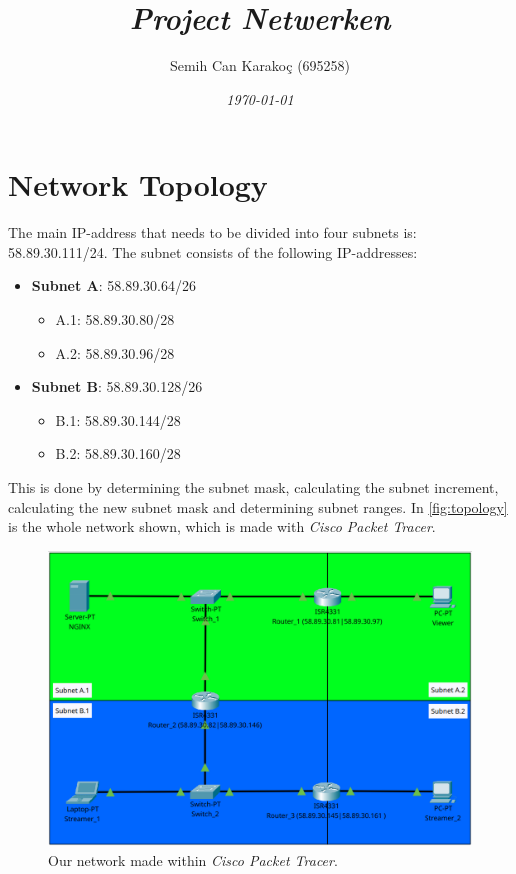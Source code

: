 \documentclass[a4paper,1pt]{article}
\title{\textit{Project Netwerken}}
\author{{Semih Can Karakoç (695258)}}
\date{\textit{\today}}
\begin{document}
\clearpage\maketitle    %
\thispagestyle{empty}  %
\begin{figure}[H]
    \centering
\end{figure}
\pagebreak

\tableofcontents    %
\pagebreak

\section{Network Topology}
The main IP-address that needs to be divided into four subnets is: 58.89.30.111/24. 
The subnet consists of the following IP-addresses:
\begin{itemize}
	\item \textbf{Subnet A}: 58.89.30.64/26
	\begin{itemize}
		\item A.1: 58.89.30.80/28
		\item A.2: 58.89.30.96/28
	\end{itemize}
	\item \textbf{Subnet B}: 58.89.30.128/26
	\begin{itemize}
		\item B.1: 58.89.30.144/28
		\item B.2: 58.89.30.160/28
	\end{itemize}
\end{itemize}
This is done by determining the subnet mask, calculating the subnet increment, calculating the new subnet mask and determining subnet ranges.  
In \autoref{fig:topology} is the whole network shown, which is made with \textit{Cisco Packet Tracer}.
\begin{figure}[H]
	\centering
	\includegraphics[width=\textwidth]{t.png}
	\caption{Our network made within \textit{Cisco Packet Tracer}.}
	\label{fig:topology}
\end{figure}
\pagebreak
\end{document}
